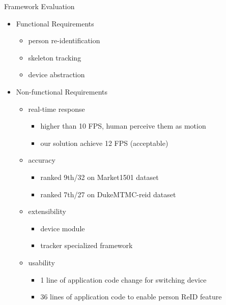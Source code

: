 \documentclass{beamer}
\begin{document}
\begin{frame}{Framework Evaluation}
     \begin{itemize}
        \item Functional Requirements
        
            \begin{itemize}
                \item person re-identification
                \item skeleton tracking
                \item device abstraction
            \end{itemize}
        
        \item Non-functional Requirements
        
            \begin{itemize}
                \item real-time response
                \begin{itemize}
                    \item higher than 10 FPS, human perceive them as motion
                    \cite{wikipedia-frame-rate}
                    \item our solution achieve 12 FPS (acceptable)
                \end{itemize}
                \item accuracy
                \begin{itemize}
                    \item ranked 9th/32 on Market1501 dataset
                    \item ranked 7th/27 on DukeMTMC-reid dataset
                \end{itemize}
                \item extensibility
                \begin{itemize}
                    \item device module
                    \item tracker specialized framework
                \end{itemize}
                \item usability
                \begin{itemize}
                    \item 1 line of application code change for switching device
                    \item 36 lines of application code to enable person ReID 
                    feature
                \end{itemize}
            \end{itemize}
    \end{itemize}


\end{frame}
\end{document}
